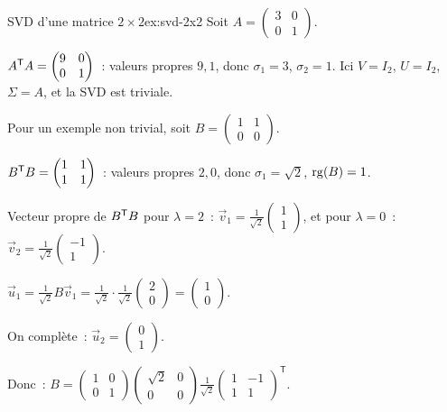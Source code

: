 \begin{example}{SVD d'une matrice $2 \times 2$}{ex:svd-2x2}
  Soit $A = \begin{pmatrix} 3 & 0 \\ 0 & 1 \end{pmatrix}$.

  ${A}^{\mathsf{T}}A = \begin{pmatrix} 9 & 0 \\ 0 & 1 \end{pmatrix}$~:
  valeurs propres $9, 1$, donc $\sigma_1 = 3$, $\sigma_2 = 1$.
  Ici $V = I_2$, $U = I_2$, $\Sigma = A$, et la SVD est triviale.

  Pour un exemple non trivial, soit
  $B = \begin{pmatrix} 1 & 1 \\ 0 & 0 \end{pmatrix}$.

  ${B}^{\mathsf{T}}B = \begin{pmatrix} 1 & 1 \\ 1 & 1 \end{pmatrix}$~:
  valeurs propres $2, 0$, donc $\sigma_1 = \sqrt{2}$, $\operatorname{rg}(B) = 1$.

  Vecteur propre de ${B}^{\mathsf{T}}B$ pour $\lambda = 2$~:
  $\vec{v}_1 = \frac{1}{\sqrt{2}}\begin{pmatrix} 1 \\ 1 \end{pmatrix}$,
  et pour $\lambda = 0$~:
  $\vec{v}_2 = \frac{1}{\sqrt{2}}\begin{pmatrix} -1 \\ 1 \end{pmatrix}$.

  $\vec{u}_1 = \frac{1}{\sqrt{2}} B \vec{v}_1
  = \frac{1}{\sqrt{2}} \cdot \frac{1}{\sqrt{2}}\begin{pmatrix} 2 \\ 0 \end{pmatrix}
  = \begin{pmatrix} 1 \\ 0 \end{pmatrix}$.

  On complète~: $\vec{u}_2 = \begin{pmatrix} 0 \\ 1 \end{pmatrix}$.

  Donc~: $B = \begin{pmatrix} 1 & 0 \\ 0 & 1 \end{pmatrix}
  \begin{pmatrix} \sqrt{2} & 0 \\ 0 & 0 \end{pmatrix}
  \frac{1}{\sqrt{2}}\begin{pmatrix} 1 & -1 \\ 1 & 1 \end{pmatrix}^{\mathsf{T}}$.
\end{example}

